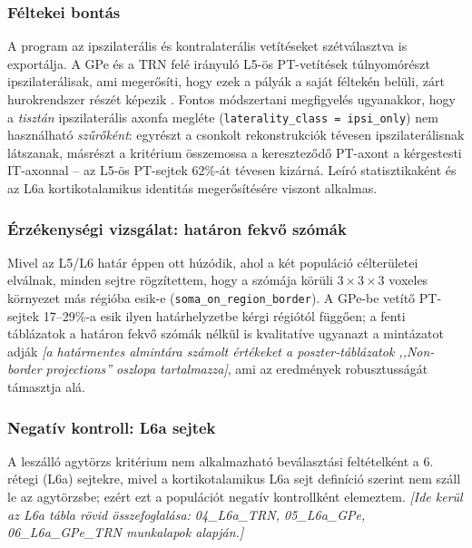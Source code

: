 \subsubsection{Féltekei bontás}

A program az ipszilaterális és kontralaterális vetítéseket szétválasztva is
exportálja. A GPe és a TRN felé irányuló L5-ös PT-vetítések túlnyomórészt
ipszilaterálisak, ami megerősíti, hogy ezek a pályák a saját féltekén belüli,
zárt hurokrendszer részét képezik \cite{abecassis2020}. Fontos módszertani
megfigyelés ugyanakkor, hogy a \emph{tisztán} ipszilaterális axonfa megléte
(\texttt{laterality\_class = ipsi\_only}) nem használható \emph{szűrőként}:
egyrészt a csonkolt rekonstrukciók tévesen ipszilaterálisnak látszanak,
másrészt a kritérium összemossa a kereszteződő PT-axont a kérgestesti
IT-axonnal -- az L5-ös PT-sejtek 62\%-át tévesen kizárná. Leíró statisztikaként
és az L6a kortikotalamikus identitás megerősítésére viszont alkalmas.

\subsubsection{Érzékenységi vizsgálat: határon fekvő szómák}

Mivel az L5/L6 határ éppen ott húzódik, ahol a két populáció célterületei
elválnak, minden sejtre rögzítettem, hogy a szómája körüli $3\times3\times3$
voxeles környezet más régióba esik-e (\texttt{soma\_on\_region\_border}).
A GPe-be vetítő PT-sejtek 17--29\%-a esik ilyen határhelyzetbe kérgi
régiótól függően; a fenti táblázatok a határon fekvő szómák nélkül is
kvalitatíve ugyanazt a mintázatot adják \emph{[a határmentes almintára
számolt értékeket a poszter-táblázatok ,,Non-border projections'' oszlopa
tartalmazza]}, ami az eredmények robusztusságát támasztja alá.

\subsubsection{Negatív kontroll: L6a sejtek}

A leszálló agytörzs kritérium nem alkalmazható beválasztási feltételként a
6. rétegi (L6a) sejtekre, mivel a kortikotalamikus L6a sejt definíció szerint
nem száll le az agytörzsbe; ezért ezt a populációt negatív kontrollként
elemeztem. \emph{[Ide kerül az L6a tábla rövid összefoglalása: 04\_L6a\_TRN,
05\_L6a\_GPe, 06\_L6a\_GPe\_TRN munkalapok alapján.]}
